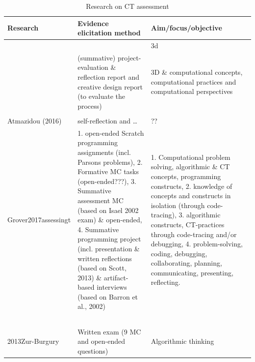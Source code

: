 \begin{table}
  \centering

\begin{tabular}{|l|l|l|}
  \hline
   \textbf{Research} & \textbf{Evidence elicitation method} & \textbf{Aim/focus/objective} \\
  \hline
  \cite{BrennanResnick2012} &  & 3d  \\
  \cite{Zhong2016} &  (summative) project-evaluation \& reflection report and creative design report (to evaluate the process)  &  3D \& computational concepts, computational practices and computational perspectives \\
  \cite{LyeKoh2014} &   &   \\
  Atmazidou (2016) & self-reflection and \ldots  & ??  \\
  Grover2017assessingt & 1. open-ended Scratch programming assignments (incl. Parsons problems), 2. Formative MC tasks (open-ended???), 3. Summative assessment MC (based on Isael 2002 exam) \& open-ended, 4. Summative programming project (incl. presentation \& written reflections (based on Scott, 2013) \& artifact-based interviews (based on Barron et al., 2002) & 1. Computational problem solving, algorithmic \& CT concepts, programming constructs, 2. knowledge of concepts and constructs in isolation (through code-tracing), 3. algorithmic constructs, CT-practices through code-tracing and/or debugging, 4. problem-solving, coding, debugging, collaborating, planning, communicating, presenting, reflecting.\\
  \cite{bienkowski2015assessment} &   &   \\
  \cite{snow2017CTECD} &   &   \\

  \cite{Lonati2017Bebras} &   &   \\
  \cite{Seiter2013} &   &   \\
  \cite{Lee2011} &   &   \\
  2013Zur-Burgury & Written exam (9 MC and open-ended questions) & Algorithmic thinking\\
  \hline
\end{tabular}


\caption{Research on CT assessment}\label{table:CTassessmentResearch}
\end{table}



